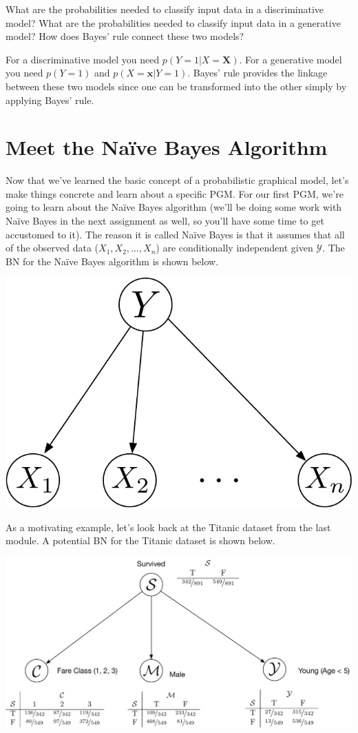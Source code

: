 \documentclass[assignment03_Solutions]{subfiles}
\begin{document}
\begin{understandingcheck}
What are the probabilities needed to classify input data in a discriminative model?  What are the probabilities needed to classify input data in a generative model?  How does Bayes' rule connect these two models?

\begin{boxedsolution}
For a discriminative model you need $p(Y=1 | X = \mathbf{X})$.  For a generative model you need $p(Y=1)$ and $p(X = \mathbf{x} | Y=1)$.  Bayes' rule provides the linkage between these two models since one can be transformed into the other simply by applying Bayes' rule.
\end{boxedsolution}
\end{understandingcheck}


\section{Meet the Na\"ive Bayes Algorithm}
Now that we've learned the basic concept of a probabilistic graphical model, let's make things concrete and learn about a specific PGM.  For our first PGM, we're going to learn about the Na\"ive Bayes algorithm (we'll be doing some work with Na\"ive Bayes in the next assignment as well, so you'll have some time to get accustomed to it).  The reason it is called Na\"ive Bayes is that it assumes that all of the observed data ($X_1, X_2, \ldots, X_n$) are conditionally independent given $\mathcal{Y}$.  The BN for the Na\"ive Bayes algorithm is shown below.
\begin{center}
\includegraphics[width=0.3\linewidth]{figures/naivebayesgm}
\end{center}

As a motivating example, let's look back at the Titanic dataset from the last module.  A potential BN for the Titanic dataset is shown below.

\begin{center}
\includegraphics[width=0.8\linewidth]{figures/titanicbn}
\end{center}
\end{document}
